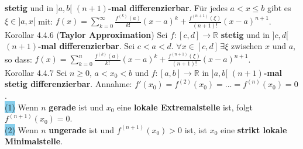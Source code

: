 \documentclass[landscape, 10pt]{article}
\newcommand{\R}{\mathbb{R}}
\begin{document}
\begin{multicols}{3}
                     \textbf{stetig} und in 
                     \textcolor{NavyBlue}{$]a,b[$} 
                     \textbf{$(n+1)$-mal differenzierbar}. 
                     Für jedes \textcolor{NavyBlue}{$a<x\leqslant b$} gibt es 
                     \textcolor{NavyBlue}{$\xi\in]a,x[$} mit: 
                     \textcolor{NavyBlue}{
                     $f(x)=\sum_{k=0}^\infty\frac{f^{(k)}(a)}{k!}(x-a)^k
                     +\frac{f^{(n+1)}(\xi)}{(n+1)!}(x-a)^{n+1}$}. \\
              \colorbox{BurntOrange}{Korollar 4.4.6} 
              (\textbf{Taylor Approximation}) 
                     Sei \textcolor{NavyBlue}{$f:[c,d]\longrightarrow\R$} 
                     \textbf{stetig} und in 
                     \textcolor{NavyBlue}{$]c,d[$} 
                     \textbf{$(n+1)$-mal differenzierbar}. Sei 
                     \textcolor{NavyBlue}{$c<a<d$}. 
                     \textcolor{NavyBlue}{$\forall x\in[c,d]\,\exists\xi$} zwischen 
                     \textcolor{NavyBlue}{$x$} und \textcolor{NavyBlue}{$a$}, 
                     so dass: \textcolor{NavyBlue}{
                     $f(x)=\sum_{k=0}^n\frac{f^{(k)}(a)}{k!}(x-a)^k
                     +\frac{f^{(n+1)}(\xi)}{(n+1)!}(x-a)^{n+1}$}.\\
              \colorbox{BurntOrange}{Korollar 4.4.7} 
                     Sei \textcolor{NavyBlue}{$n\geqslant0,\,a<x_0<b$} und 
                     \textcolor{NavyBlue}{$f:[a,b]\longrightarrow\R$} 
                     in \textcolor{NavyBlue}{$]a,b[$} 
                     \textbf{$(n+1)$-mal stetig differenzierbar}.
                     Annahme: \textcolor{NavyBlue}{
                     $f'(x_0)=f^{(2)}(x_0)=...=f^{(n)}(x_0)=0$}. \\
                     \colorbox{SkyBlue}{(1)} 
                            Wenn \textcolor{NavyBlue}{$n$} 
                            \textbf{gerade} 
                            ist und \textcolor{NavyBlue}{$x_0$} eine 
                            \textbf{lokale Extremalstelle} ist, folgt
                            \textcolor{NavyBlue}{ $f^{(n+1)}(x_0)=0$}. \\
                     \colorbox{SkyBlue}{(2)} Wenn \textcolor{NavyBlue}{$n$} 
                            \textbf{ungerade}
                            ist und 
                            \textcolor{NavyBlue}{$f^{(n+1)}(x_0)>0$} ist, ist 
                            \textcolor{NavyBlue}{$x_0$} 
                            eine \textbf{strikt lokale Minimalstelle}. \\

\end{multicols}
\end{document}
